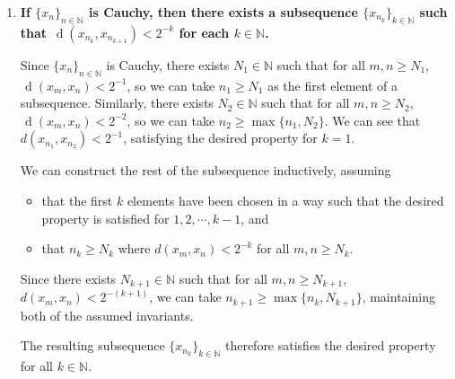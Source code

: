 \documentclass[a4paper,12pt]{article}
\newcommand*\dist{\mathop{\!\mathrm{d}}}
\begin{document}
\begin{enumerate}
\begin{enumerate}[label=(\alph*)]
            \item
                \sloppy
                \boldmath\textbf{If $\{x_n\}_{n \in \mathbb{N}}$ is Cauchy, then there exists a subsequence $\{x_{n_k}\}_{k \in \mathbb{N}}$ such that $\dist(x_{n_k}, x_{n_{k + 1}}) < 2^{-k}$ for each $k \in \mathbb{N}$.
                }\unboldmath \par
                Since $\{x_n\}_{n \in \mathbb{N}}$ is Cauchy, there exists $N_1 \in \mathbb{N}$ such that for all $m, n \geq N_1$, $\dist(x_m, x_n) < 2^{-1}$, so we can take $n_1 \geq N_1$ as the first element of a subsequence. Similarly, there exists $N_2 \in \mathbb{N}$ such that for all $m, n \geq N_2$, $\dist(x_m, x_n) < 2^{-2}$, so we can take $n_2 \geq \max\{n_1, N_2\}$. We can see that $d(x_{n_1}, x_{n_2}) < 2^{-1}$, satisfying the desired property for $k = 1$. \par
                We can construct the rest of the subsequence inductively, assuming
                \begin{itemize}
                    \item
                        that the first $k$ elements have been chosen in a way such that the desired property is satisfied for $1, 2, \cdots, k - 1$, and
                    \item
                        that $n_k \geq N_k$ where $d(x_m, x_n) < 2^{-k}$ for all $m, n \geq N_k$.
                \end{itemize}
                Since there exists $N_{k + 1} \in \mathbb{N}$ such that for all $m, n \geq N_{k + 1}$, $d(x_m, x_n) < 2^{-(k + 1)}$, we can take $n_{k + 1} \geq \max\{ n_k, N_{k + 1} \}$, maintaining both of the assumed invariants. \par
                The resulting subsequence $\{ x_{n_k} \}_{k \in \mathbb{N}}$ therefore satisfies the desired property for all $k \in \mathbb{N}$.
        \end{enumerate}


\end{enumerate}
\end{document}
